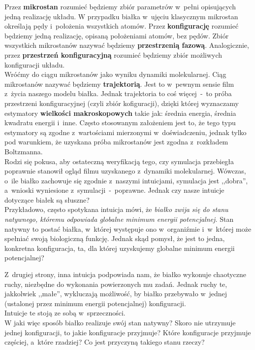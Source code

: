 \documentclass[a4paper,11pt,twoside]{book}
\begin{document}
Przez {\bf mikrostan} rozumieć będziemy zbiór parametrów w~pełni opisujących jedną realizację układu. W przypadku białka w~ujęciu klasycznym mikrostan określają pędy i~położenia wszystkich atomów. Przez {\bf konfigurację} rozumieć będziemy jedną realizację, opisaną położeniami atomów, bez pędów. Zbiór wszystkich mikrostanów nazywać będziemy {\bf przestrzenią fazową}. Analogicznie, przez {\bf przestrzeń konfiguracyjną} rozumieć będziemy zbiór możliwych konfiguracji układu.\\

Wróćmy do ciągu mikrostanów jako wyniku dynamiki molekularnej. Ciąg mikrostanów nazywać będziemy {\bf trajektorią}. Jest to w~pewnym sensie film z~życia naszego modelu białka. Jednak trajektoria to coś więcej~-~to próba przestrzeni konfiguracyjnej (czyli zbiór kofiguracji), dzięki której wyznaczamy estymatory {\bf wielkości makroskopowych} takie jak: średnia energia, średnia kwadratu energii i~inne. Często stosowanym założeniem jest to, że tego typu estymatory są zgodne z~wartościami mierzonymi w~doświadczeniu, jednak tylko pod warunkiem, że uzyskana próba mikrostanów jest zgodna z~rozkładem Boltzmanna.\\

Rodzi się pokusa, aby ostateczną weryfikacją tego, czy symulacja przebiegła poprawnie stanowił ogląd filmu uzyskanego z~dynamiki molekularnej. Wówczas, o~ile białko zachowuje się zgodnie z~naszymi intuicjami, symulacja jest ,,dobra'', a~wnioski wyniesione z~symulacji~-~poprawne. Jednak czy nasze intuicje dotyczące białek są słuszne?\\

Przykładowo, często spotykana intuicja mówi, że \emph{białko zwija się do stanu natywnego, któremu odpowiada globalne minimum energii potencjalnej.} Stan natywny to postać białka, w~której występuje ono w~organiźmie i~w~której może spełniać swoją biologiczną funkcję. Jednak skąd pomysł, że jest to jedna, konkretna konfiguracja, ta, dla której uzyskujemy globalne minimum energii potencjalnej? 

Z~drugiej strony, inna intuicja podpowiada nam, że białko wykonuje chaotyczne ruchy, niezbędne do wykonania powierzonych mu zadań. Jednak ruchy te, jakkolwiek ,,małe'', wykluczają możliwość, by białko przebywało w~jednej (ustalonej przez minimum energii potencjalnej) konfiguracji.\\

Intuicje te stoją ze sobą w~sprzeczności.\\

W jaki więc sposób białko realizuje swój stan natywny? Skoro nie utrzymuje jednej konfiguracji, to jakie konfiguracje przyjmuje? Które konfiguracje przyjmuje częściej, a~które rzadziej? Co jest przyczyną takiego stanu rzeczy?\\
\end{document}
